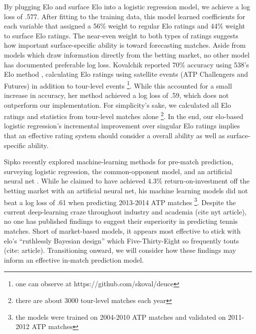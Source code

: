 \documentclass[chapterprefix=false]{report}
\begin{document}
By plugging Elo and surface Elo into a logistic regression model, we achieve a log loss of .577. After fitting to the training data, this model learned coefficients for each variable that assigned a 56\% weight to regular Elo ratings and 44\% weight to surface Elo ratings. The near-even weight to both types of ratings suggests how important surface-specific ability is toward forecasting matches. Aside from models which draw information directly from the betting market, no other model has documented preferable log loss. Kovalchik reported 70$\%$ accuracy using 538's Elo method \cite{Kovalchik2016}, calculating Elo ratings using satellite events (ATP Challengers and Futures) in addition to tour-level events \footnote{one can observe at https://github.com/skoval/deuce}. While this accounted for a small increase in accuracy, her method achieved a log loss of .59, which does not outperform our implementation. For simplicity's sake, we calculated all Elo ratings and statistics from tour-level matches alone \footnote{there are about 3000 tour-level matches each year}. In the end, our elo-based logistic regression's incremental improvement over singular Elo ratings implies that an effective rating system should consider a overall ability as well as surface-specific ability.




Sipko recently explored machine-learning methods for pre-match prediction, surveying logistic regression, the common-opponent model, and an artificial neural net \cite{Sipko2015}. While he claimed to have achieved 4.3$\%$ return-on-investment off the betting market with an artificial neural net, his machine learning models did not beat a log loss of .61 when predicting 2013-2014 ATP matches \footnote{the models were trained on 2004-2010 ATP matches and validated on 2011-2012 ATP matches}. Despite the current deep-learning craze throughout industry and academia (cite nyt article), no one has published findings to suggest their superiority in predicting tennis matches. Short of market-based models, it appears most effective to stick with elo's ``ruthlessly Bayesian design'' which Five-Thirty-Eight so frequently touts (cite: article). Transitioning onward, we will consider how these findings may inform an effective in-match prediction model.
\end{document}
